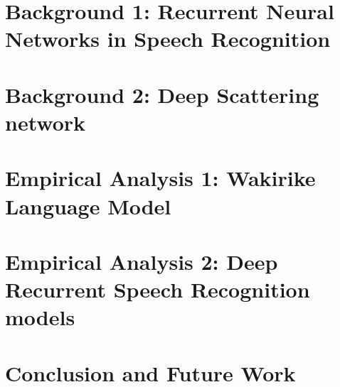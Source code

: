 \documentclass[12pt,twoside]{report}
\begin{document}
\chapter{Background 1: Recurrent Neural Networks in Speech Recognition}\label{ch3RNN}


\chapter{Background 2: Deep Scattering network}\label{ch4DSN}


\chapter{Empirical Analysis 1: Wakirike Language Model}\label{ch6_wlm}


\chapter{Empirical Analysis 2: Deep Recurrent Speech Recognition models}\label{ch6_speech}


\chapter{Conclusion and Future Work}\label{ch8_future}


\chapter*{\appendix}
\label{app_haar}
\chapter*{\appendix}

\chapter*{\appendix}

\chapter*{\appendix}
\label{app4_tfcode}
\chapter*{\appendix}
\label{app5_okd}

\startblue

\stopblue
\end{document}
